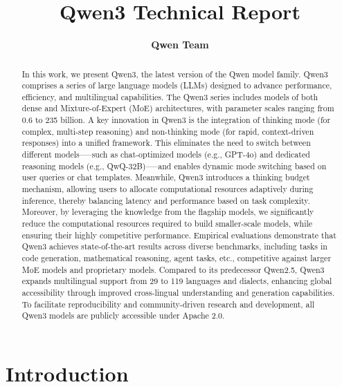 \documentclass[dvipsnames]{article}
\title{Qwen3 Technical Report}
\author{
\bf Qwen Team
}
\begin{document}
\maketitle

\begin{abstract}
In this work, we present Qwen3, the latest version of the Qwen model family.
Qwen3 comprises a series of large language models (LLMs) designed to advance performance, efficiency, and multilingual capabilities. 
The Qwen3 series includes models of both dense and Mixture-of-Expert (MoE) architectures, with parameter scales ranging from 0.6 to 235 billion. 
A key innovation in Qwen3 is the integration of thinking mode (for complex, multi-step reasoning) and non-thinking mode (for rapid, context-driven responses) into a unified framework. 
This eliminates the need to switch between different models—--such as chat-optimized models (e.g., GPT-4o) and dedicated reasoning models (e.g., QwQ-32B)—--and enables dynamic mode switching based on user queries or chat templates.
Meanwhile, Qwen3 introduces a thinking budget mechanism, allowing users to allocate computational resources adaptively during inference, thereby balancing latency and performance based on task complexity.
Moreover, by leveraging the knowledge from the flagship models, we significantly reduce the computational resources required to build smaller-scale models, while ensuring their highly competitive performance.
Empirical evaluations demonstrate that Qwen3 achieves state-of-the-art results across diverse benchmarks, including tasks in code generation, mathematical reasoning, agent tasks, etc., competitive against larger MoE models and proprietary models. Compared to its predecessor Qwen2.5, Qwen3 expands multilingual support from 29 to 119 languages and dialects, enhancing global accessibility through improved cross-lingual understanding and generation capabilities.
To facilitate reproducibility and community-driven research and development, all Qwen3 models are publicly accessible under Apache 2.0. 

\end{abstract}

\vfill

\newpage

\section{Introduction}
\label{sec:intro}
\end{document}
